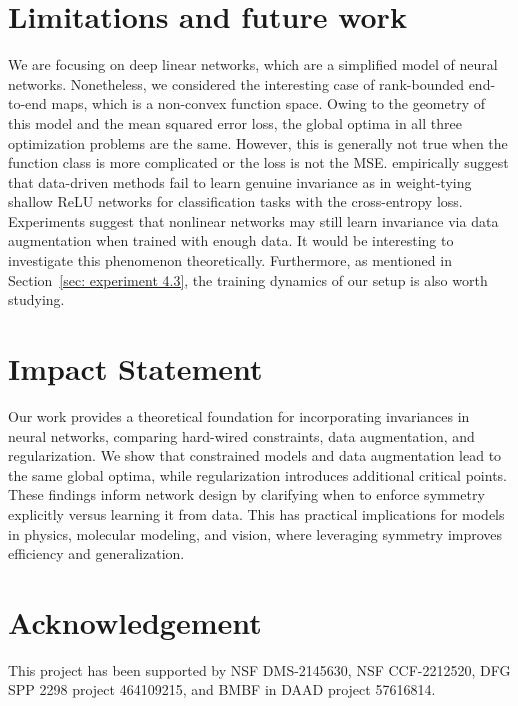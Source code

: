 \documentclass{article}
\theoremstyle{plain}
\theoremstyle{definition}
\theoremstyle{remark}
\theoremstyle{remark}
\begin{document}
\section{Limitations and future work}
We are focusing on deep linear networks, which are a simplified model of neural networks. Nonetheless, we considered the interesting case of rank-bounded end-to-end maps, which is a non-convex function space. 
Owing to the geometry of this model and the mean squared error loss, the global optima in all three optimization problems are the same. 
However, this is generally not true when the function class is more complicated or the loss is not the MSE. \citet{moskalev2023ginvariance} empirically suggest that data-driven methods fail to learn genuine invariance as in weight-tying shallow ReLU networks for classification tasks with the cross-entropy loss.
Experiments suggest that nonlinear networks may still learn invariance via data augmentation when trained with enough data. It would be interesting to investigate this phenomenon theoretically. Furthermore, as mentioned in Section~\ref{sec: experiment 4.3}, the training dynamics of our setup is also worth studying. 

\section*{Impact Statement}
Our work provides a theoretical foundation for incorporating invariances in neural networks, comparing hard-wired constraints, data augmentation, and regularization. We show that constrained models and data augmentation lead to the same global optima, while regularization introduces additional critical points. These findings inform network design by clarifying when to enforce symmetry explicitly versus learning it from data. This has practical implications for models in physics, molecular modeling, and vision, where leveraging symmetry improves efficiency and generalization.

\section*{Acknowledgement} 
This project has been supported by NSF DMS-2145630, NSF CCF-2212520, DFG SPP 2298 project 464109215, and BMBF in DAAD project 57616814.





\newpage
\appendix
\onecolumn
\end{document}
